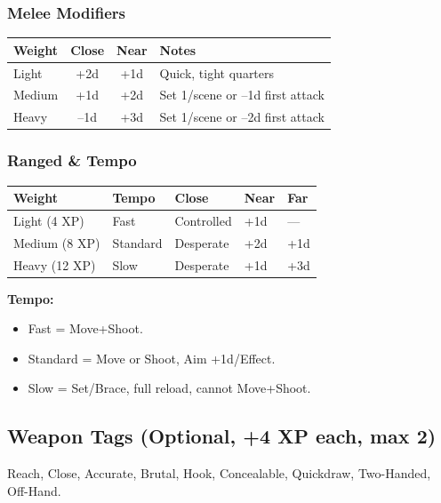 \documentclass[11pt,twoside,openany]{book}
\begin{document}
\subsubsection*{Melee Modifiers}

\begin{center}
\begin{tabular}{|l|c|c|l|}
\hline
\textbf{Weight} & \textbf{Close} & \textbf{Near} & \textbf{Notes} \\
\hline
Light & +2d & +1d & Quick, tight quarters \\
Medium & +1d & +2d & Set 1/scene or --1d first attack \\
Heavy & --1d & +3d & Set 1/scene or --2d first attack \\
\hline
\end{tabular}
\end{center}

\subsubsection*{Ranged \& Tempo}

\begin{center}
\begin{tabular}{|l|l|l|l|l|}
\hline
\textbf{Weight} & \textbf{Tempo} & \textbf{Close} & \textbf{Near} & \textbf{Far} \\
\hline
Light (4 XP) & Fast & Controlled & +1d & --- \\
Medium (8 XP) & Standard & Desperate & +2d & +1d \\
Heavy (12 XP) & Slow & Desperate & +1d & +3d \\
\hline
\end{tabular}
\end{center}

\textbf{Tempo:} 
\begin{itemize}
\item Fast = Move+Shoot. 
\item Standard = Move or Shoot, Aim +1d/Effect. 
\item Slow = Set/Brace, full reload, cannot Move+Shoot.
\end{itemize}

\subsection*{Weapon Tags (Optional, +4 XP each, max 2)}

Reach, Close, Accurate, Brutal, Hook, Concealable, Quickdraw, Two-Handed, Off-Hand.
\end{document}
